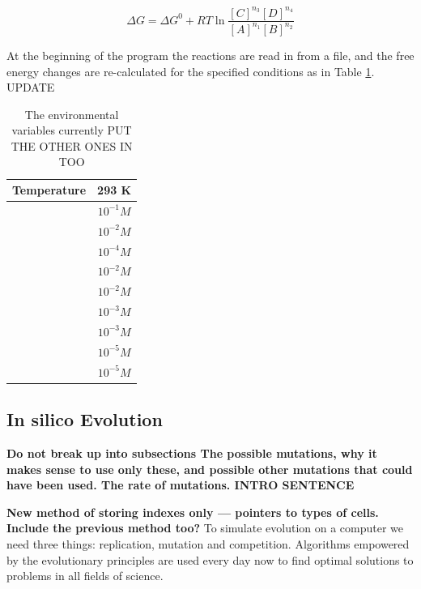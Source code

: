 \documentclass[10pt,a4paper]{article}
\begin{document}
	\begin{equation}\label{eq:freeechange}
		\Delta G = \Delta G^0 + R T \ln \frac{[C]^{n_3}[D]^{n_4}}{[A]^{n_1}[B]^{n_2}}
	\end{equation}
	
	At the beginning of the program the reactions are read in from a file, and the free energy changes are re-calculated for the specified conditions as in Table \ref{environmentTable}. UPDATE
	
	\begin{table}
		\centering
	\begin{tabular}{|c|c|}
		
		\hline Temperature & 293 K \\ 
		\hline [ATP] & $10^{-1} M$ \\ 
		\hline [ADP] & $10^{-2} M$ \\ 
		\hline [AMP] & $10^{-4} M$ \\ 
		\hline [NAD] & $10^{-2} M$ \\ 
		\hline [NADH] & $10^{-2} M$ \\ 
		\hline [Pi] &  $10^{-3} M$\\ 
		\hline [PPi] & $10^{-3} M$ \\ 
		\hline [CO$_2$] & $10^{-5} M$ \\ 
		\hline [NH$_3$] & $10^{-5} M$ \\ 

		\hline 
	\end{tabular} 
	\caption{The environmental variables currently PUT THE OTHER ONES IN TOO}
	\label{environmentTable}
	\end{table}





\subsection{In silico Evolution}
\label{sub:implementing evolution}
\textbf{
Do not break up into subsections
The possible mutations, why it makes sense to use only these, and possible other mutations that could have been used. The rate of mutations. 
INTRO SENTENCE}

\textbf{New method of storing indexes only --- pointers to types of cells. Include the previous method too?}
To simulate evolution on a computer we need three things: replication, mutation and competition. Algorithms empowered by the evolutionary principles \cite{evolutionaryalgorithms} are used every day now to find optimal solutions to problems in all fields of science.
\end{document}
